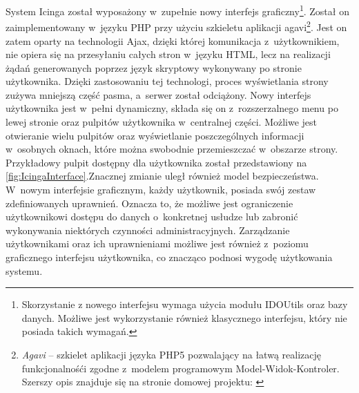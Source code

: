 System Icinga został wyposażony w~zupełnie nowy interfejs
graficzny\footnote{Skorzystanie z nowego interfejsu wymaga użycia
  modułu IDOUtils oraz bazy danych. Możliwe jest wykorzystanie również
  klasycznego interfejsu, który nie posiada takich wymagań.}. Został
on zaimplementowany w~języku PHP przy użyciu szkieletu aplikacji
agavi\footnote{{\em Agavi } -- szkielet aplikacji języka PHP5
  pozwalający na łatwą realizację funkcjonalnośći zgodne z~modelem
  programowym Model-Widok-Kontroler. Szerszy opis znajduje się na
  stronie domowej projektu: \cite{www:Agavi}}. Jest on zatem oparty na
technologii Ajax, dzięki której komunikacja z~użytkownikiem, nie opiera
się na przesyłaniu całych stron w~języku HTML, lecz na realizacji
żądań generowanych poprzez język skryptowy wykonywany po stronie
użytkownika. Dzięki zastosowaniu tej technologi, proces wyświetlania
strony zużywa mniejszą część pasma, a~serwer został odciążony. Nowy
interfejs użytkownika jest w~pełni dynamiczny, składa się on
z~rozszerzalnego menu po lewej stronie oraz pulpitów użytkownika
w~centralnej części. Możliwe jest otwieranie wielu pulpitów oraz
wyświetlanie poszczególnych informacji w~osobnych oknach, które można
swobodnie przemieszczać w~obszarze strony. Przykładowy pulpit dostępny
dla użytkownika został przedstawiony na
\ref{fig:IcingaInterface}.Znacznej zmianie uległ również model
bezpieczeństwa. W~nowym interfejsie graficznym, każdy użytkownik,
posiada swój zestaw zdefiniowanych uprawnień. Oznacza to, że możliwe
jest ograniczenie użytkownikowi dostępu do danych o~konkretnej usłudze
lub zabronić wykonywania niektórych czynności
administracyjnych. Zarządzanie użytkownikami oraz ich uprawnieniami
możliwe jest również z~poziomu graficznego interfejsu użytkownika, co
znacząco podnosi wygodę użytkowania systemu.

